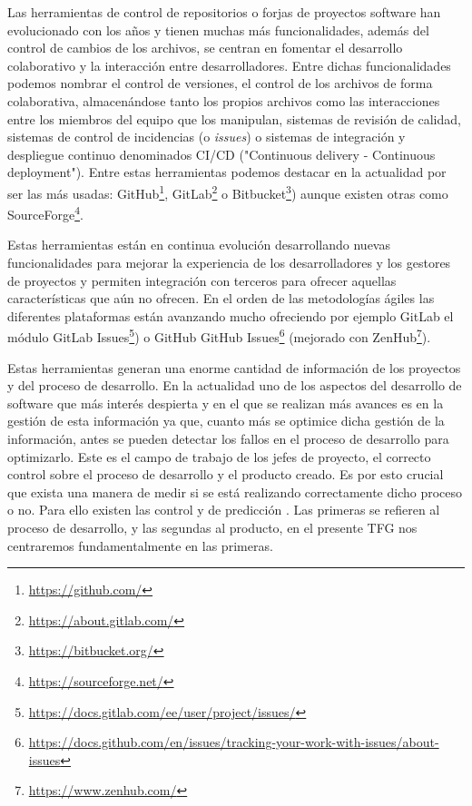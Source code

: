 Las herramientas de control de repositorios o forjas de proyectos software han evolucionado con los años y tienen muchas más funcionalidades, además del control de cambios de los archivos, se centran en fomentar el desarrollo colaborativo y la interacción entre desarrolladores.
Entre dichas funcionalidades podemos nombrar el control de versiones, el control de los archivos de forma colaborativa, almacenándose tanto los propios archivos como las interacciones entre los miembros del equipo que los manipulan, sistemas de revisión de calidad, sistemas de control de incidencias (o \textit{issues}) o sistemas de integración y despliegue continuo denominados CI/CD ("Continuous delivery - Continuous deployment").
Entre estas herramientas podemos destacar en la actualidad por ser las más usadas:  GitHub\footnote{\url{https://github.com/}}, GitLab\footnote{\url{https://about.gitlab.com/}} o Bitbucket\footnote{\url{https://bitbucket.org/}}) aunque existen otras como SourceForge\footnote{\url{https://sourceforge.net/}}.

Estas herramientas están en continua evolución desarrollando nuevas funcionalidades para mejorar la experiencia de los desarrolladores y los gestores de proyectos y permiten integración con terceros para ofrecer aquellas características que aún no ofrecen.
En el orden de las metodologías ágiles las diferentes plataformas están avanzando mucho ofreciendo por ejemplo GitLab el módulo GitLab Issues\footnote{\url{https://docs.gitlab.com/ee/user/project/issues/}}) o  
GitHub GitHub Issues\footnote{\url{https://docs.github.com/en/issues/tracking-your-work-with-issues/about-issues}} (mejorado con ZenHub\footnote{\url{https://www.zenhub.com/}}).

Estas herramientas generan una enorme cantidad de información de los proyectos y del proceso de desarrollo. En la actualidad uno de los aspectos del desarrollo de software que más interés despierta y en el que se realizan más avances es en la gestión de esta información ya que, cuanto más se optimice dicha gestión de la información, antes se pueden detectar los fallos en el proceso de desarrollo para optimizarlo.
Este es el campo de trabajo de los jefes de proyecto, el correcto control sobre el proceso de desarrollo y el producto creado. Es por esto crucial que exista una manera de medir si se está realizando correctamente dicho proceso o no.
Para ello existen las control y de predicción \cite{sommerville_ingenierisoftware_2002}. Las primeras se refieren al proceso de desarrollo, y las segundas al producto, en el presente TFG nos centraremos fundamentalmente en las primeras.

